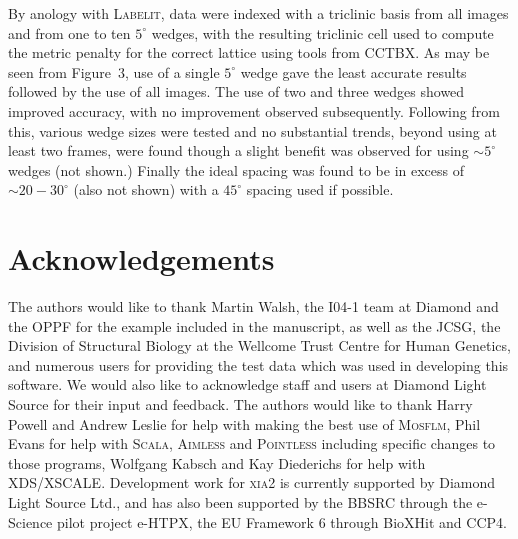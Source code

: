 \documentclass[a4paper, 11pt]{article}
\begin{document}
By anology with \textsc{Labelit}, data were indexed with a triclinic basis
from all images and from one to ten $5^{\circ}$ wedges, with the
resulting triclinic cell used to
compute the metric penalty for the correct lattice
using tools from CCTBX. As may be seen
from Figure~3,
use of a single $5^{\circ}$ wedge gave the least accurate
results followed by the use of all images. The use of two and three
wedges showed improved accuracy, with no improvement observed
subsequently. Following from this, various wedge sizes were tested and
no substantial trends, beyond using at least two frames, were found
though a slight benefit was observed for using $\sim 5^{\circ}$ wedges
(not shown.) Finally the ideal spacing was found to be 
in excess of $\sim 20 - 30^{\circ}$ (also not shown) with a
$45^{\circ}$ spacing used if possible.  




\section{Acknowledgements}
 
The authors would like to thank Martin Walsh, the I04-1 team at
Diamond  and the OPPF for the
example included in the manuscript, as well as
the JCSG, the Division of Structural Biology at
the Wellcome Trust Centre for Human Genetics,
and numerous users for providing the test data which was used in 
developing this software. We would also like to acknowledge staff and users 
at Diamond Light Source for their input and feedback.
The authors would like to thank Harry Powell
and Andrew Leslie for help with making the best use of \textsc{Mosflm},
Phil Evans for help with \textsc{Scala}, \textsc{Aimless} and
\textsc{Pointless} including  
specific changes to those programs, Wolfgang Kabsch and Kay Diederichs
for help with XDS/XSCALE. 
Development work for \textsc{xia2} is currently supported by Diamond
Light Source Ltd., and has also been supported by the BBSRC
through the e-Science pilot project e-HTPX, the EU Framework 6 through 
BioXHit and CCP4.
\end{document}
